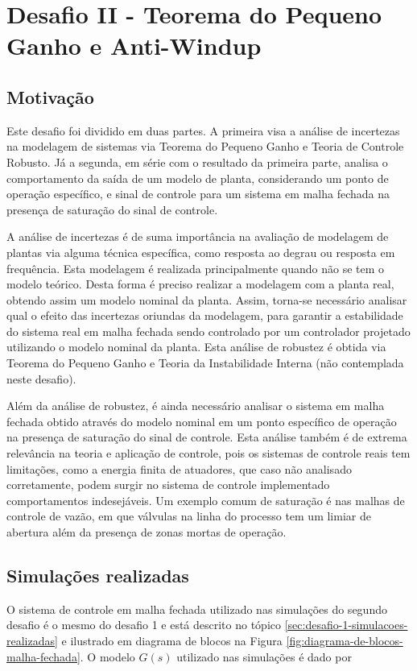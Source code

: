 \section{Desafio II - Teorema do Pequeno Ganho e Anti-Windup} 
 
\subsection{Motivação}
Este desafio foi dividido em duas partes. A primeira visa a análise de
incertezas na modelagem de sistemas via Teorema do Pequeno Ganho e Teoria de
Controle Robusto. Já a segunda, em série com o resultado da primeira parte,
analisa o comportamento da saída de um modelo de planta, considerando um ponto
de operação específico, e sinal de controle para um sistema em malha fechada na
presença de saturação do sinal de controle.

A análise de incertezas é de suma importância na avaliação de modelagem de
plantas via alguma técnica específica, como resposta ao degrau ou resposta em
frequência. Esta modelagem é realizada principalmente quando não se tem o modelo
teórico. Desta forma é preciso realizar a modelagem com a planta real, obtendo
assim um modelo nominal da planta. Assim, torna-se necessário analisar qual o
efeito das incertezas oriundas da modelagem, para garantir a estabilidade do
sistema real em malha fechada sendo controlado por um controlador projetado
utilizando o modelo nominal da planta. Esta análise de robustez é obtida via
Teorema do Pequeno Ganho e Teoria da Instabilidade Interna (não contemplada
neste desafio).

Além da análise de robustez, é ainda necessário analisar o sistema em malha
fechada obtido através do modelo nominal em um ponto específico de operação na
presença de saturação do sinal de controle. Esta análise também é de extrema
relevância na teoria e aplicação de controle, pois os sistemas de controle
reais tem limitações, como a energia finita de atuadores, que caso não analisado
corretamente, podem surgir no sistema de controle implementado comportamentos
indesejáveis. Um exemplo comum de saturação é nas malhas de controle de vazão,
em que válvulas na linha do processo tem um limiar de abertura além da presença
de zonas mortas de operação.

\subsection{Simulações realizadas}
O sistema de controle em malha fechada utilizado nas simulações do segundo
desafio é o mesmo do desafio 1 e está descrito no tópico
\ref{sec:desafio-1-simulacoes-realizadas} e ilustrado em diagrama de blocos na
Figura \ref{fig:diagrama-de-blocos-malha-fechada}. O modelo $G(s)$ utilizado nas
simulações é dado por

